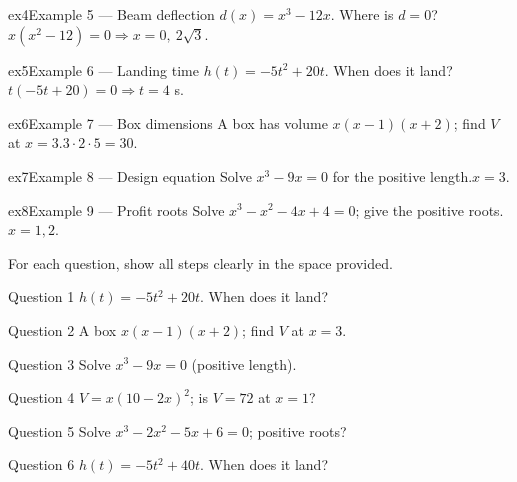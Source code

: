 \documentclass[11pt]{article}
\begin{document}
\begin{example}{ex4}{Example 5 --- Beam deflection}
$d(x)=x^3-12x$. Where is $d=0$?\soln $x(x^2-12)=0\Rightarrow x=0,\ 2\sqrt3$.
\end{example}

\begin{example}{ex5}{Example 6 --- Landing time}
$h(t)=-5t^2+20t$. When does it land?\soln $t(-5t+20)=0\Rightarrow t=4$ s.
\end{example}

\begin{example}{ex6}{Example 7 --- Box dimensions}
A box has volume $x(x-1)(x+2)$; find $V$ at $x=3$.\soln $3\cdot2\cdot5=30$.
\end{example}

\begin{example}{ex7}{Example 8 --- Design equation}
Solve $x^3-9x=0$ for the positive length.\soln $x=3$.
\end{example}

\begin{example}{ex8}{Example 9 --- Profit roots}
Solve $x^3-x^2-4x+4=0$; give the positive roots.\soln $x=1,2$.
\end{example}

\clearpage
{}
For each question, show all steps clearly in the space provided.

\begin{qbox}{Question 1}
$h(t)=-5t^2+20t$. When does it land?\workspace{2.4cm}
\end{qbox}

\begin{qbox}{Question 2}
A box $x(x-1)(x+2)$; find $V$ at $x=3$.\workspace{2.4cm}
\end{qbox}

\begin{qbox}{Question 3}
Solve $x^3-9x=0$ (positive length).\workspace{2.4cm}
\end{qbox}

\begin{qbox}{Question 4}
$V=x(10-2x)^2$; is $V=72$ at $x=1$?\workspace{2.4cm}
\end{qbox}

\begin{qbox}{Question 5}
Solve $x^3-2x^2-5x+6=0$; positive roots?\workspace{2.4cm}
\end{qbox}

\begin{qbox}{Question 6}
$h(t)=-5t^2+40t$. When does it land?\workspace{2.4cm}
\end{qbox}
\end{document}
